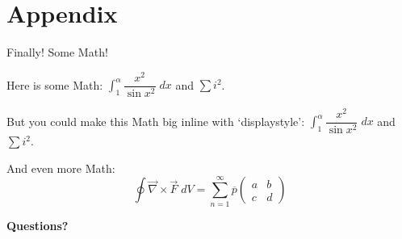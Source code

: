 \documentclass[aspectratio=169]{beamer}	%
\newcommand{\ds}{\displaystyle}
\newcommand{\ov}[1]{\overline{#1}}
\newcommand{\twomatrix}[4]{\begin{pmatrix} #1 & #2 \\ #3 & #4 \end{pmatrix}}
\theoremstyle{plain}
\theoremstyle{definition}
\theoremstyle{remark}
\numberwithin{equation}{section}
\begin{document}
\section{Appendix}



\begin{frame}
Finally! Some Math! \vspace{1cm}

Here is some Math: $\int_1^\alpha \dfrac{x^2}{\sin x^2} \;dx$ and $\sum i^2$. \vspace{1cm}

But you could make this Math big inline with `displaystyle': $\ds \int_1^\alpha \dfrac{x^2}{\sin x^2} \;dx$ and $\ds \sum i^2$. \vspace{1cm}

And even more Math:
	\[
	\oint \vec{\nabla} \times \vec{F} \;dV = \sum_{n=1}^\infty \ov{p} \twomatrix{a}{b}{c}{d}
	\]
\end{frame}


\begin{frame}
\begin{center} {\bfseries \Large Questions?} \end{center}
\end{frame}
\end{document}
